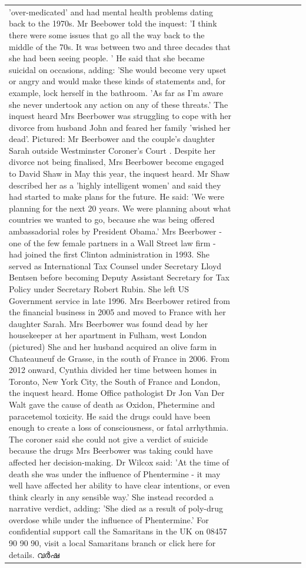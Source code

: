 \begin{table}[H]
\begin{tabular}{lllrlllll}
'over-medicated' and had mental health problems dating back to the 1970s. Mr Beebower told the inquest: 'I think there were some issues that go all the way back to the middle of the 70s. It was between two and three decades that she had been seeing people. ' He said that she became suicidal on occasions, adding: 'She would become very upset or angry and would make these kinds of statements and, for example, lock herself in the bathroom. 'As far as I'm aware she never undertook any action on any of these threats.' The inquest heard Mrs Beerbower was struggling to cope with her divorce from husband John and feared her family 'wished her dead'. Pictured: Mr Beerbower and the couple's daughter Sarah outside Westminster Coroner's Court . Despite her divorce not being finalised, Mrs Beerbower become engaged to David Shaw in May this year, the inquest heard. Mr Shaw described her as a 'highly intelligent women' and said they had started to make plans for the future. He said: 'We were planning for the next 20 years. We were planning about what countries we wanted to go, because she was being offered ambassadorial roles by President Obama.' Mrs Beerbower - one of the few female partners in a Wall Street law firm - had joined the first Clinton administration in 1993. She served as International Tax Counsel under Secretary Lloyd Bentsen before becoming Deputy Assistant Secretary for Tax Policy under Secretary Robert Rubin. She left US Government service in late 1996. Mrs Beerbower retired from the financial business in 2005 and moved to France with her daughter Sarah. Mrs Beerbower was found dead by her housekeeper at her apartment in Fulham, west London (pictured) She and her husband acquired an olive farm in Chateauneuf de Grasse, in the south of France in 2006. From 2012 onward, Cynthia divided her time between homes in Toronto, New York City, the South of France and London, the inquest heard. Home Office pathologist Dr Jon Van Der Walt gave the cause of death as Oxidon, Phetermine and paracetemol toxicity. He said the drugs could have been enough to create a loss of consciousness, or fatal arrhythmia. The coroner said she could not give a verdict of suicide because the drugs Mrs Beerbower was taking could have affected her decision-making. Dr Wilcox said: 'At the time of death she was under the influence of Phentermine - it may well have affected her ability to have clear intentions, or even think clearly in any sensible way.' She instead recorded a narrative verdict, adding: 'She died as a result of poly-drug overdose while under the influence of Phentermine.' For confidential support call the Samaritans in the UK on 08457 90 90 90, visit a local Samaritans branch or click here for details. വര്‍ഷ \\

\end{tabular}
\end{table}

